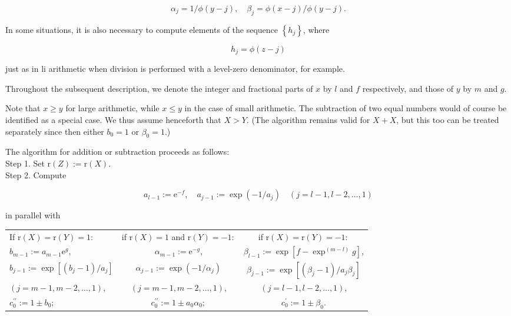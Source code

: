 \documentclass[10pt]{article}
\begin{document}
$$
\alpha_{j}=1 / \phi(y-j), \quad \beta_{j}=\phi(x-j) / \phi(y-j) .
$$

In some situations, it is also necessary to compute elements of the sequence $\left\{h_{j}\right\}$, where

$$
h_{j}=\phi(z-j)
$$

just as in li arithmetic when division is performed with a level-zero denominator, for example.

Throughout the subsequent description, we denote the integer and fractional parts of $x$ by $l$ and $f$ respectively, and those of $y$ by $m$ and $g$.

Note that $x \geqslant y$ for large arithmetic, while $x \leqslant y$ in the case of small arithmetic. The subtraction of two equal numbers would of course be identified as a special case. We thus assume henceforth that $X>Y$. (The algorithm remains valid for $X+X$, but this too can be treated separately since then either $b_{0}=1$ or $\beta_{0}=1$.)

The algorithm for addition or subtraction proceeds as follows:\\
Step 1. Set $\mathrm{r}(Z):=\mathrm{r}(X)$.\\
Step 2. Compute

$$
a_{l-1}:=\mathrm{e}^{-f}, \quad a_{j-1}:=\exp \left(-1 / a_{j}\right) \quad(j=l-1, l-2, \ldots, 1)
$$

in parallel with

\begin{center}
\begin{tabular}{l|c|c}
If $\mathrm{r}(X)=\mathrm{r}(Y)=1:$ & if $\mathrm{r}(X)=1$ and $\mathrm{r}(Y)=-1:$ & if $\mathrm{r}(X)=\mathrm{r}(Y)=-1:$ \\
$b_{m-1}:=a_{m-1} \mathrm{e}^{g}$, & $\alpha_{m-1}:=\mathrm{e}^{-g}$, & $\beta_{l-1}:=\exp \left[f-\exp ^{(m-l)} g\right]$, \\
$b_{j-1}:=\exp \left[\left(b_{j}-1\right) / a_{j}\right]$ & $\alpha_{j-1}:=\exp \left(-1 / \alpha_{j}\right)$ & $\beta_{j-1}:=\exp \left[\left(\beta_{j}-1\right) / a_{j} \beta_{j}\right]$ \\
$(j=m-1, m-2, \ldots, 1)$, & $(j=m-1, m-2, \ldots, 1)$, & $(j=l-1, l-2, \ldots, 1)$, \\
$c_{0}^{\prime \prime}:=1 \pm b_{0} ;$ & $c_{0}^{\prime \prime}:=1 \pm a_{0} \alpha_{0} ;$ & $c_{0}^{\prime}:=1 \pm \beta_{0}$. \\
\end{tabular}
\end{center}
\end{document}
